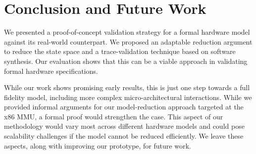 \section{Conclusion and Future Work}\label{sec:conclusion}

We presented a proof-of-concept validation strategy for a formal hardware model against its real-world counterpart. 
We proposed an adaptable  reduction argument to reduce the state space and a trace-validation technique based on software synthesis.
Our evaluation shows that this can be a viable approach in validating formal hardware specifications.

While our work shows promising early results, this is just one step towards a full fidelity model, 
including more complex micro-architectural interactions. While we provided informal arguments for our model-reduction approach targeted at the x86 MMU, a formal proof would strengthen the case. This aspect of our methodology would vary most across different hardware models and could pose scalability challenges if the model cannot be reduced efficiently.
We leave these aspects, along with improving our prototype, for future work.



